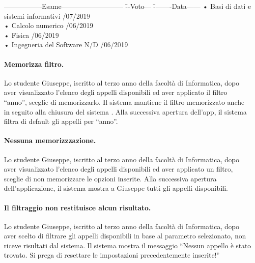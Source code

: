 \begin{tabbing}
	\hspace{1cm}-----------------Esame--------------------------- \= --Voto--- \= --------Data------ \kill
	\hspace{1cm} • Basi di dati e sistemi informativi  /07/2019 \\
	\hspace{1cm} • Calcolo numerico  /06/2019 \\
	\hspace{1cm} • Fisica  /06/2019 \\
	\hspace{1cm} • Ingegneria del Software \> N/D /06/2019  \\
\end{tabbing}

\paragraph{Memorizza filtro.}
Lo studente Giuseppe, iscritto al terzo anno della facoltà di Informatica, dopo aver visualizzato l’elenco degli appelli disponibili ed aver applicato il filtro “anno”, sceglie di memorizzarlo. Il sistema mantiene il filtro memorizzato anche in seguito alla chiusura del sistema . Alla successiva apertura dell’app, il sistema filtra di default gli appelli per “anno”.

\paragraph{Nessuna memorizzzazione.}
Lo studente Giuseppe, iscritto al terzo anno della facoltà di Informatica, dopo aver visualizzato l’elenco degli appelli disponibili ed aver applicato un filtro, sceglie di non memorizzare le opzioni inserite. Alla successiva apertura dell'applicazione, il sistema mostra a Giuseppe tutti gli appelli disponibili.

\paragraph{Il filtraggio non restituisce alcun risultato.}
 Lo studente Giuseppe, iscritto al terzo anno della facoltà di Informatica, dopo aver scelto di filtrare gli appelli disponibili in base al parametro selezionato, non riceve risultati dal sistema. Il sistema mostra il messaggio “Nessun appello è stato trovato. Si prega di resettare le impostazioni precedentemente inserite!”
 
